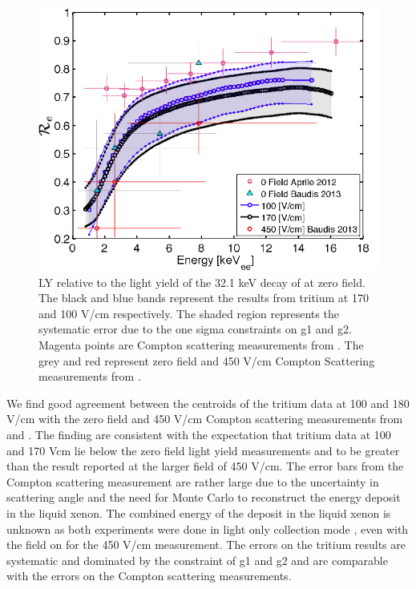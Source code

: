 \begin{figure}[h!]\centering
 \includegraphics[width=150mm]{Chapter_Flucs/Figures/LYQY_iter1/Re_fig.png}
\caption{LY relative to the light yield of the 32.1 keV decay of \KrCal at zero field. The black and blue bands represent the results from tritium at 170 and 100 V/cm respectively. The shaded region represents the systematic error due to the one sigma constraints on g1 and g2.  Magenta points are Compton scattering measurements from \cite{Aprile_LY}. The grey and red represent zero field and 450 V/cm Compton Scattering measurements from \cite{Baudis}. }
\label{fig:LYQY_data}
\end{figure}

We find good agreement between the centroids of the tritium data at 100 and 180 V/cm with the zero field and 450 V/cm Compton scattering measurements from \cite{Aprile_LY} and \cite{Baudis}. The finding are consistent with the expectation that tritium data at 100 and 170 Vcm lie below the zero field light yield measurements and to be greater than the result reported at the larger field of 450 V/cm. The error bars from the Compton scattering measurement are rather large due to the uncertainty in scattering angle and the need for Monte Carlo to reconstruct the energy deposit in the liquid xenon. The combined energy of the deposit in the liquid xenon is unknown as both experiments were done in light only collection mode \cite{Aprile_LY}  \cite{Baudis}, even with the field on for the 450 V/cm measurement. The errors on the tritium results are systematic and dominated by the constraint of g1 and g2 and are comparable with the errors on the Compton scattering measurements. 

